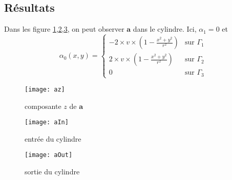 

\subsection{Résultats}
Dans les figure \ref{az},\ref{aIn},\ref{aOut}, on peut observer $\bm{a}$ dans le cylindre. Ici, $\alpha_1=0$ et 
\[ \alpha_0(x,y)= \begin{cases} -2\times v\times\left(1-\frac{x^2+y^2}{r^2}\right) &\mbox{sur } \Gamma_1\\
2\times v\times\left(1-\frac{x^2+y^2}{r^2}\right)&\mbox{sur } \Gamma_2\\
0 &\mbox{sur } \Gamma_3 \end{cases} \]

\begin{figure}[H]
\centering
\texttt{[image: az]}
\caption{composante $z$ de $\bm{a}$}
\label{az}
\end{figure}
\begin{figure}[H]
\centering
\texttt{[image: aIn]}
\caption{entrée du cylindre}
\label{aIn}
\end{figure}
\begin{figure}[H]
\centering
\texttt{[image: aOut]}
\caption{sortie du cylindre}
\label{aOut}
\end{figure}


